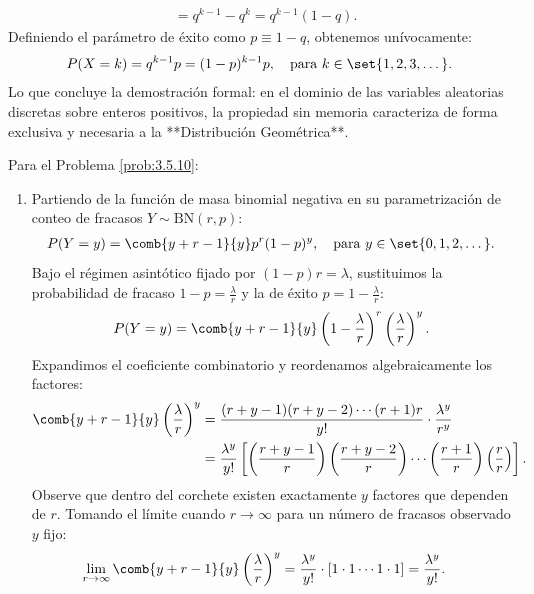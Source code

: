 \begin{solucion}
\begin{enumerate}
\begin{align*}
			&= q^{k-1} - q^k = q^{k-1}(1 - q).
		\end{align*}
		Definiendo el parámetro de éxito como $p \equiv 1 - q$, obtenemos unívocamente:
		\begin{align*}
			P(X = k) = q^{k-1} p = (1-p)^{k-1} p, \quad \text{para } k \in \set{1, 2, 3, \dots}.
		\end{align*}
		Lo que concluye la demostración formal: en el dominio de las variables aleatorias discretas sobre enteros positivos, la propiedad sin memoria caracteriza de forma exclusiva y necesaria a la **Distribución Geométrica**.
	\end{enumerate}
\end{solucion}

\begin{solucion}
	\label{sol:3.5.10}
	Para el Problema \ref{prob:3.5.10}:
	\begin{enumerate}
		\item Partiendo de la función de masa binomial negativa en su parametrización de conteo de fracasos $Y \sim \text{BN}(r, p)$:
		\begin{align*}
			P(Y = y) = \comb{y+r-1}{y} p^r (1-p)^y, \quad \text{para } y \in \set{0, 1, 2, \dots}.
		\end{align*}
		Bajo el régimen asintótico fijado por $(1-p)r = \lambda$, sustituimos la probabilidad de fracaso $1-p = \frac{\lambda}{r}$ y la de éxito $p = 1 - \frac{\lambda}{r}$:
		\begin{align*}
			P(Y = y) = \comb{y+r-1}{y} \left(1 - \dfrac{\lambda}{r}\right)^r \left(\dfrac{\lambda}{r}\right)^y.
		\end{align*}
		Expandimos el coeficiente combinatorio y reordenamos algebraicamente los factores:
		\begin{align*}
			\comb{y+r-1}{y} \left(\dfrac{\lambda}{r}\right)^y &= \dfrac{(r+y-1)(r+y-2)\cdots(r+1)r}{y!} \cdot \dfrac{\lambda^y}{r^y} \\
			&= \dfrac{\lambda^y}{y!} \left[ \left(\dfrac{r+y-1}{r}\right)\left(\dfrac{r+y-2}{r}\right)\cdots\left(\dfrac{r+1}{r}\right)\left(\dfrac{r}{r}\right) \right].
		\end{align*}
		Observe que dentro del corchete existen exactamente $y$ factores que dependen de $r$. Tomando el límite cuando $r \to \infty$ para un número de fracasos observado $y$ fijo:
		\begin{align*}
			\lim_{r \to \infty} \comb{y+r-1}{y} \left(\dfrac{\lambda}{r}\right)^y &= \dfrac{\lambda^y}{y!} \cdot \left[ 1 \cdot 1 \cdots 1 \cdot 1 \right] = \dfrac{\lambda^y}{y!}.

\end{align*}
\end{enumerate}
\end{solucion}
